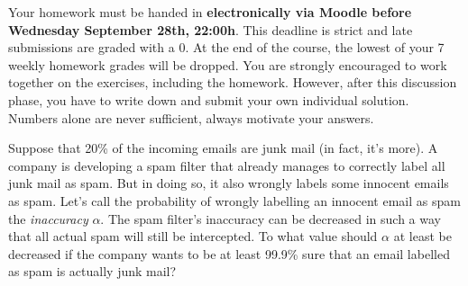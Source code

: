\documentclass[a4paper,10pt,landscape,twocolumn]{scrartcl}
\newcommand\deadline{Wednesday September 28th, 22:00h}
\begin{document}
\homeworkproblems

{\sffamily\noindent
Your homework must be handed in \textbf{electronically via Moodle before \deadline}.  This deadline is strict and late submissions are graded with a 0. At the end of the course, the lowest of your 7 weekly homework grades will be dropped. You are strongly encouraged to work together on the exercises, including the homework. However, after this discussion phase, you have to write down and submit your own individual solution. Numbers alone are never sufficient, always motivate your answers.
}



\begin{exercise}
	Suppose that 20\% of the incoming emails are junk mail (in fact, it's more). A company is developing a spam filter that already manages to correctly label all junk mail as spam. But in doing so, it also wrongly labels some innocent emails as spam. Let's call the probability of wrongly labelling an innocent email as spam the \emph{inaccuracy} $\alpha$. 
%	
	The spam filter's inaccuracy can be decreased in such a way that all actual spam will still be intercepted. To what value should $\alpha$ at least be decreased if the company wants to be at least 99.9\% sure that an email labelled as spam is actually junk mail?
\end{exercise}
\end{document}
